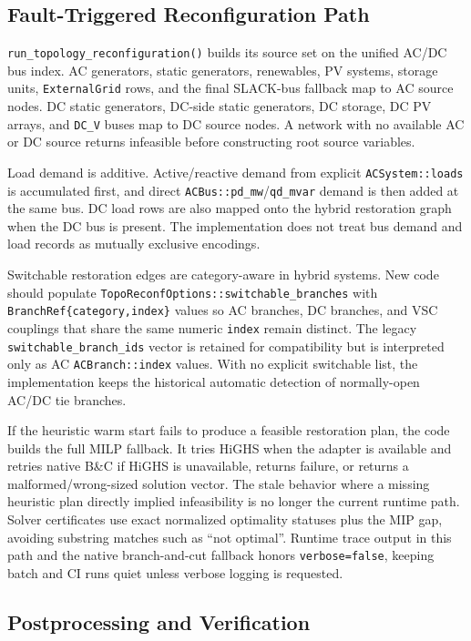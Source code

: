 \subsection{Fault-Triggered Reconfiguration Path}

\texttt{run\_topology\_reconfiguration()} builds its source set on the unified
AC/DC bus index.  AC generators, static generators, renewables, PV systems,
storage units, \texttt{ExternalGrid} rows, and the final SLACK-bus fallback map
to AC source nodes.  DC static generators, DC-side static generators, DC
storage, DC PV arrays, and \texttt{DC\_V} buses map to DC source nodes.  A network
with no available AC or DC source returns infeasible before constructing root
source variables.

Load demand is additive.  Active/reactive demand from explicit
\texttt{ACSystem::loads} is accumulated first, and direct
\texttt{ACBus::pd\_mw}/\texttt{qd\_mvar} demand is then added at the same bus.
DC load rows are also mapped onto the hybrid restoration graph when the DC bus
is present.  The implementation does not treat bus demand and load records as
mutually exclusive encodings.

Switchable restoration edges are category-aware in hybrid systems.  New code
should populate \texttt{TopoReconfOptions::switchable\_branches} with
\texttt{BranchRef\{category,index\}} values so AC branches, DC branches, and
VSC couplings that share the same numeric \texttt{index} remain distinct.  The
legacy \texttt{switchable\_branch\_ids} vector is retained for compatibility but
is interpreted only as AC \texttt{ACBranch::index} values.  With no explicit
switchable list, the implementation keeps the historical automatic detection of
normally-open AC/DC tie branches.

If the heuristic warm start fails to produce a feasible restoration plan, the
code builds the full MILP fallback.  It tries HiGHS when the adapter is
available and retries native B\&C if HiGHS is unavailable, returns failure, or
returns a malformed/wrong-sized solution vector.  The stale behavior where a
missing heuristic plan directly implied infeasibility is no longer the current
runtime path.  Solver certificates use exact normalized optimality statuses plus
the MIP gap, avoiding substring matches such as ``not optimal''.  Runtime trace
output in this path and the native branch-and-cut fallback honors
\texttt{verbose=false}, keeping batch and CI runs quiet unless verbose logging is
requested.

\subsection{Postprocessing and Verification}

